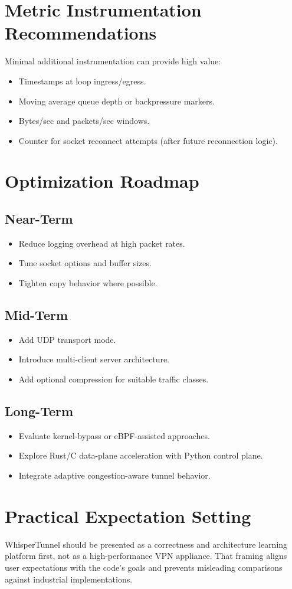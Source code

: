 \section{Metric Instrumentation Recommendations}
Minimal additional instrumentation can provide high value:
\begin{itemize}[leftmargin=2em]
\item Timestamps at loop ingress/egress.
\item Moving average queue depth or backpressure markers.
\item Bytes/sec and packets/sec windows.
\item Counter for socket reconnect attempts (after future reconnection logic).
\end{itemize}

\section{Optimization Roadmap}
\subsection{Near-Term}
\begin{itemize}[leftmargin=2em]
\item Reduce logging overhead at high packet rates.
\item Tune socket options and buffer sizes.
\item Tighten copy behavior where possible.
\end{itemize}

\subsection{Mid-Term}
\begin{itemize}[leftmargin=2em]
\item Add UDP transport mode.
\item Introduce multi-client server architecture.
\item Add optional compression for suitable traffic classes.
\end{itemize}

\subsection{Long-Term}
\begin{itemize}[leftmargin=2em]
\item Evaluate kernel-bypass or eBPF-assisted approaches.
\item Explore Rust/C data-plane acceleration with Python control plane.
\item Integrate adaptive congestion-aware tunnel behavior.
\end{itemize}

\section{Practical Expectation Setting}
WhisperTunnel should be presented as a correctness and architecture learning platform first, not as a high-performance VPN appliance. That framing aligns user expectations with the code's goals and prevents misleading comparisons against industrial implementations.
